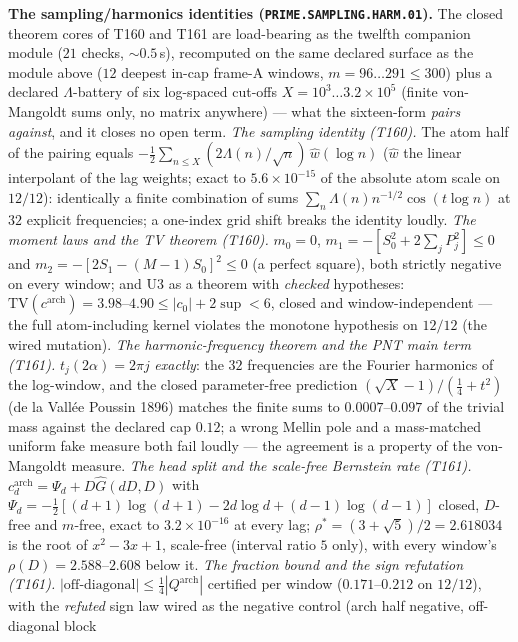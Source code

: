 \documentclass[11pt,a4paper]{article}
\theoremstyle{definition}
\begin{document}
\par\smallskip\noindent\textbf{The sampling/harmonics identities
(\texttt{PRIME.SAMPLING.HARM.01}).}
The closed theorem cores of T160 and T161 are load-bearing as the twelfth
companion module ($21$ checks, ${\sim}0.5$\,s), recomputed on the same
declared surface as the module above ($12$ deepest in-cap frame-A
windows, $m=96\ldots291\le300$) plus a declared $\Lambda$-battery of six
log-spaced cut-offs $X=10^{3}\ldots3.2\times10^{5}$ (finite von-Mangoldt
sums only, no matrix anywhere) --- what the sixteen-form \emph{pairs
against}, and it closes no open term.
\emph{The sampling identity (T160).} The atom half of the pairing equals
$-\tfrac12\sum_{n\le X}(2\Lambda(n)/\sqrt n)\,\widehat w(\log n)$
($\widehat w$ the linear interpolant of the lag weights; exact to
$5.6\times10^{-15}$ of the absolute atom scale on $12/12$): identically a
finite combination of sums $\sum_n\Lambda(n)n^{-1/2}\cos(t\log n)$ at
$32$ explicit frequencies; a one-index grid shift breaks the identity
loudly.
\emph{The moment laws and the TV theorem (T160).} $m_0=0$,
$m_1=-[S_0^2+2\sum_jP_j^2]\le0$ and $m_2=-[2S_1-(M{-}1)S_0]^2\le0$ (a
perfect square), both strictly negative on every window; and U3 as a
theorem with \emph{checked} hypotheses:
$\mathrm{TV}(c^{\mathrm{arch}})=3.98$--$4.90\le|c_0|+2\sup<6$, closed and
window-independent --- the full atom-including kernel violates the
monotone hypothesis on $12/12$ (the wired mutation).
\emph{The harmonic-frequency theorem and the PNT main term (T161).}
$t_j(2\alpha)=2\pi j$ \emph{exactly}: the $32$ frequencies are the
Fourier harmonics of the log-window, and the closed parameter-free
prediction $(\sqrt X-1)/(\tfrac14+t^2)$ (de la Vall\'ee Poussin 1896)
matches the finite sums to $0.0007$--$0.097$ of the trivial mass against
the declared cap $0.12$; a wrong Mellin pole and a mass-matched uniform
fake measure both fail loudly --- the agreement is a property of the
von-Mangoldt measure.
\emph{The head split and the scale-free Bernstein rate (T161).}
$c^{\mathrm{arch}}_d=\Psi_d+D\widehat G(dD,D)$ with
$\Psi_d=-\tfrac12[(d{+}1)\log(d{+}1)-2d\log d+(d{-}1)\log(d{-}1)]$
closed, $D$-free and $m$-free, exact to $3.2\times10^{-16}$ at every lag;
$\rho^*=(3+\sqrt5)/2=2.618034$ is the root of $x^2-3x+1$, scale-free
(interval ratio $5$ only), with every window's $\rho(D)=2.588$--$2.608$
below it.
\emph{The fraction bound and the sign refutation (T161).}
$|\text{off-diagonal}|\le\tfrac14|Q^{\mathrm{arch}}|$ certified per
window ($0.171$--$0.212$ on $12/12$), with the \emph{refuted} sign law
wired as the negative control (arch half negative, off-diagonal block
\end{document}
